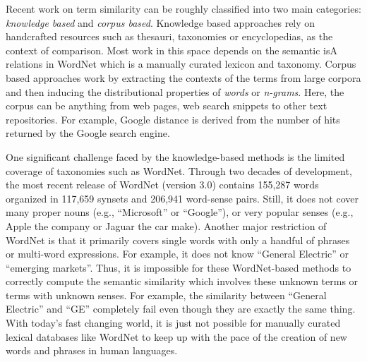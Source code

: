 Recent work on term similarity can be roughly classified into two main
categories: {\em knowledge based} and {\em corpus based}.  Knowledge
based approaches rely on handcrafted resources such as thesauri,
taxonomies or encyclopedias, as the context of comparison.  Most work
in this space \cite{Rada:1989, Resnik:1995, Agirre:2010} depends on
the semantic isA relations in WordNet \cite{Miller1995} which is a
manually curated lexicon and taxonomy.  Corpus based approaches work
by extracting the contexts of the terms from large corpora and then
inducing the distributional properties of {\em words} or {\em
  n-grams}. Here, the corpus can be anything from web pages, web
search snippets to other text repositories. For example,
Google distance \cite{Cilibrasi:Google} is derived from the number of hits returned
by the Google search engine.

One significant challenge faced by the knowledge-based methods is the
limited coverage of taxonomies such as WordNet. Through two decades of
development, the most recent release of WordNet (version 3.0) contains
155,287 words organized in 117,659 synsets and 206,941 word-sense
pairs. Still, it does not cover many proper nouns (e.g., ``Microsoft''
or ``Google''), or very popular senses (e.g., Apple the company or
Jaguar the car make). Another major restriction of WordNet is that it
primarily covers single words with only a handful of phrases or
multi-word expressions.  For example, it does not know ``General
Electric'' or ``emerging markets''.  Thus, it is impossible for these
WordNet-based methods to correctly compute the semantic similarity
which involves these unknown terms or terms with unknown senses. For
example, the similarity between ``General Electric'' and ``GE''
completely fail even though they are exactly the same thing. With
today's fast changing world, it is just not possible for manually
curated lexical databases like WordNet to keep up with the pace of the
creation of new words and phrases in human languages.
%

